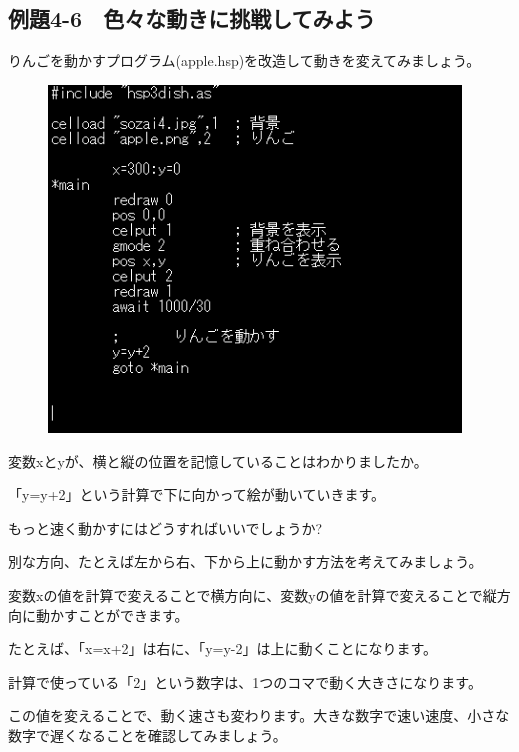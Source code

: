 \newpage
\subsection{例題4-6　色々な動きに挑戦してみよう}


\begin{description}
    \item {}
\end{description}

りんごを動かすプログラム(apple.hsp)を改造して動きを変えてみましょう。


\begin{figure}[H]
    \begin{center}
      \includegraphics[keepaspectratio,width=10.954cm,height=9.213cm]{text04-img/text04-img020.png}
    \end{center}
    \label{fig:prog_menu}
\end{figure}

変数xとyが、横と縦の位置を記憶していることはわかりましたか。

「y=y+2」という計算で下に向かって絵が動いていきます。

もっと速く動かすにはどうすればいいでしょうか?

別な方向、たとえば左から右、下から上に動かす方法を考えてみましょう。


\begin{description}
    \item {}
\end{description}



変数xの値を計算で変えることで横方向に、変数yの値を計算で変えることで縦方向に動かすことができます。

たとえば、「x=x+2」は右に、「y=y-2」は上に動くことになります。

計算で使っている「2」という数字は、1つのコマで動く大きさになります。

この値を変えることで、動く速さも変わります。大きな数字で速い速度、小さな数字で遅くなることを確認してみましょう。









